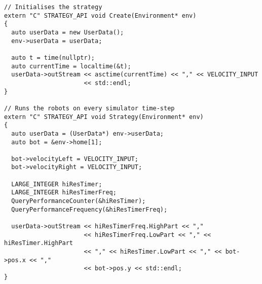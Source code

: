 \begin{lstlisting}
// Initialises the strategy
extern "C" STRATEGY_API void Create(Environment* env)
{
  auto userData = new UserData();
  env->userData = userData;

  auto t = time(nullptr);
  auto currentTime = localtime(&t);
  userData->outStream << asctime(currentTime) << "," << VELOCITY_INPUT 
                      << std::endl;
}

// Runs the robots on every simulator time-step
extern "C" STRATEGY_API void Strategy(Environment* env)
{
  auto userData = (UserData*) env->userData;
  auto bot = &env->home[1];

  bot->velocityLeft = VELOCITY_INPUT;
  bot->velocityRight = VELOCITY_INPUT;

  LARGE_INTEGER hiResTimer;
  LARGE_INTEGER hiResTimerFreq;
  QueryPerformanceCounter(&hiResTimer);
  QueryPerformanceFrequency(&hiResTimerFreq);

  userData->outStream << hiResTimerFreq.HighPart << "," 
                      << hiResTimerFreq.LowPart << "," << hiResTimer.HighPart 
                      << "," << hiResTimer.LowPart << "," << bot->pos.x << "," 
                      << bot->pos.y << std::endl; 
}
\end{lstlisting}

\cleardoublepage{}


